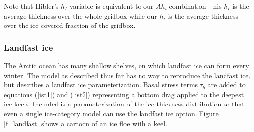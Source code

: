 Note that Hibler's $h_I$ variable is equivalent to our $A h_i$
combination - his $h_I$ is the average thickness over the whole
gridbox while our $h_i$ is the average thickness over the ice-covered
fraction of the gridbox. 

\subsubsection{Landfast ice}
\label{Landfast_ice}

The Arctic ocean has many shallow shelves, on which landfast ice
can form every winter. The model as described thus far has no way to
reproduce the landfast ice, but \citet{Lemieux_2015} describes a
landfast ice parameterization. Basal stress terms $\tau_b$ are added to
equations (\ref{ist1}) and (\ref{ist2}) representing a bottom drag
applied to the deepest ice keels. Included is a parameterization of the
ice thickness distribution so that even a single ice-category model can
use the landfast ice option. Figure \ref{f_landfast} shows a cartoon of
an ice floe with a keel.

